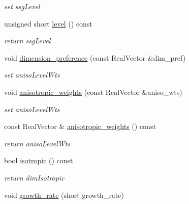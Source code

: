 \begin{DoxyCompactItemize}
\begin{DoxyCompactList}\small\item\em set ssg\+Level \end{DoxyCompactList}\item 
unsigned short \hyperlink{classPecos_1_1SparseGridDriver_a93de4719eaa26c1cd6072e84b624e837}{level} () const \label{classPecos_1_1SparseGridDriver_a93de4719eaa26c1cd6072e84b624e837}

\begin{DoxyCompactList}\small\item\em return ssg\+Level \end{DoxyCompactList}\item 
void \hyperlink{classPecos_1_1SparseGridDriver_a4a30428a7db4b7fefe865c45064ebe1c}{dimension\+\_\+preference} (const Real\+Vector \&dim\+\_\+pref)\label{classPecos_1_1SparseGridDriver_a4a30428a7db4b7fefe865c45064ebe1c}

\begin{DoxyCompactList}\small\item\em set aniso\+Level\+Wts \end{DoxyCompactList}\item 
void \hyperlink{classPecos_1_1SparseGridDriver_ae440aad65ffb98872eaa6a0801cf5b25}{anisotropic\+\_\+weights} (const Real\+Vector \&aniso\+\_\+wts)\label{classPecos_1_1SparseGridDriver_ae440aad65ffb98872eaa6a0801cf5b25}

\begin{DoxyCompactList}\small\item\em set aniso\+Level\+Wts \end{DoxyCompactList}\item 
const Real\+Vector \& \hyperlink{classPecos_1_1SparseGridDriver_a3f51a76284deb3e47f61fa5d41cdaea2}{anisotropic\+\_\+weights} () const \label{classPecos_1_1SparseGridDriver_a3f51a76284deb3e47f61fa5d41cdaea2}

\begin{DoxyCompactList}\small\item\em return aniso\+Level\+Wts \end{DoxyCompactList}\item 
bool \hyperlink{classPecos_1_1SparseGridDriver_a42aff2308a9be026471eb81f090cd29e}{isotropic} () const \label{classPecos_1_1SparseGridDriver_a42aff2308a9be026471eb81f090cd29e}

\begin{DoxyCompactList}\small\item\em return dim\+Isotropic \end{DoxyCompactList}\item 
void \hyperlink{classPecos_1_1SparseGridDriver_a6f9061513ba25c62ee7a49b0d5da42cc}{growth\+\_\+rate} (short growth\+\_\+rate)\label{classPecos_1_1SparseGridDriver_a6f9061513ba25c62ee7a49b0d5da42cc}


\end{DoxyCompactItemize}
